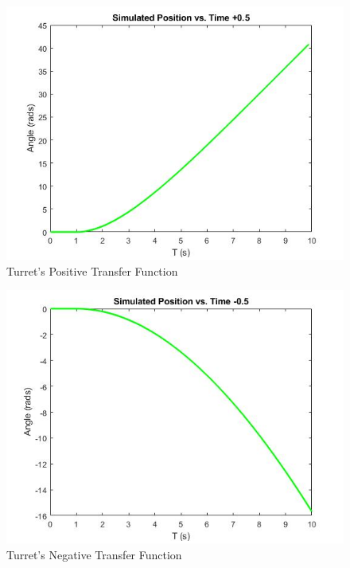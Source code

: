  \begin{figure}[h!]
     \centering
     \includegraphics[scale=.3]{tfPos.jpg}
     \caption{Turret's Positive Transfer Function}
     \label{fig:postf}
 \end{figure}
 \begin{figure}[h!]
     \centering
     \includegraphics[scale=.3]{tfNeg.jpg}
     \caption{Turret's Negative Transfer Function }
     \label{fig:negtf}
 \end{figure}                             
                          
 
